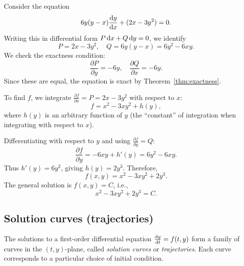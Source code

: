 \documentclass[a4paper]{article}
\begin{document}
\begin{eg}
  Consider the equation
  \[
    6y(y - x)\frac{\mathrm{d} y}{\mathrm{d} x} + (2x - 3y^2) = 0.
  \]
  Writing this in differential form $P\,\mathrm{d} x + Q\,\mathrm{d} y = 0$, we identify
  \[
    P = 2x - 3y^2, \quad Q = 6y(y - x) = 6y^2 - 6xy.
  \]
  We check the exactness condition:
  \[
    \frac{\partial P}{\partial y} = -6y, \quad \frac{\partial Q}{\partial x} = -6y.
  \]
  Since these are equal, the equation is exact by Theorem~\ref{thm:exactness}.

  To find $f$, we integrate $\frac{\partial f}{\partial x} = P = 2x - 3y^2$ with respect to $x$:
  \[
    f = x^2 - 3xy^2 + h(y),
  \]
  where $h(y)$ is an arbitrary function of $y$ (the ``constant'' of integration when integrating with respect to $x$).

  Differentiating with respect to $y$ and using $\frac{\partial f}{\partial y} = Q$:
  \[
    \frac{\partial f}{\partial y} = -6xy + h'(y) = 6y^2 - 6xy.
  \]
  Thus $h'(y) = 6y^2$, giving $h(y) = 2y^3$. Therefore,
  \[
    f(x,y) = x^2 - 3xy^2 + 2y^3.
  \]
  The general solution is $f(x,y) = C$, i.e.,
  \[
    x^2 - 3xy^2 + 2y^3 = C.
  \]
\end{eg}

\subsection{Solution curves (trajectories)}
\begin{defi}
  The solutions to a first-order differential equation $\frac{\mathrm{d} y}{\mathrm{d} t} = f(t, y)$ form a family of curves in the $(t, y)$-plane, called \emph{solution curves} or \emph{trajectories}. Each curve corresponds to a particular choice of initial condition.
\end{defi}
\end{document}
